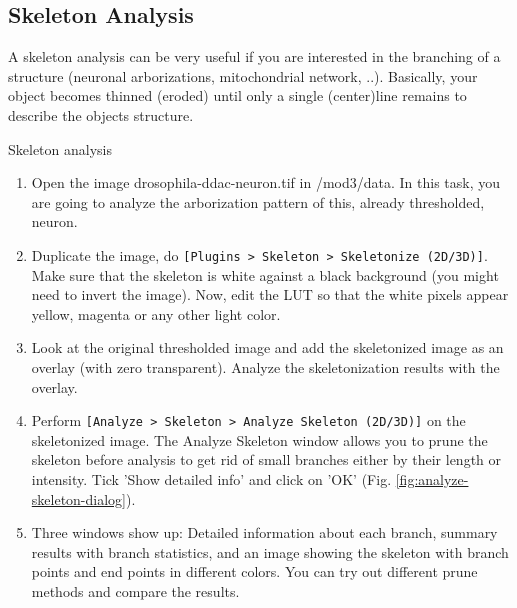 \subsection{Skeleton Analysis}
A skeleton analysis can be very useful if you are interested in the branching of a structure (neuronal arborizations, mitochondrial network, ..). Basically, your object becomes thinned (eroded) until only a single (center)line remains to describe the objects structure. 

\begin{taskbox}{Skeleton analysis}
\begin{enumerate}
	\item Open the image drosophila-ddac-neuron.tif in /mod3/data. In this task, you are going to analyze the arborization pattern of this, already thresholded, neuron. 
	\item Duplicate the image, do \texttt{[Plugins > Skeleton >
            Skeletonize (2D/3D)]}. Make sure that the skeleton is white against a black background (you might need to invert the image). Now, edit the LUT so that the white pixels appear yellow, magenta or any other light color.
	\item Look at the original thresholded image and add the skeletonized image as an overlay (with zero transparent). Analyze the skeletonization results with the overlay.
	\item Perform \texttt{[Analyze > Skeleton > Analyze Skeleton (2D/3D)]} on the skeletonized image. The Analyze Skeleton window allows you to prune the skeleton before analysis to get rid of small branches either by their length or intensity. Tick 'Show detailed info' and click on 'OK' (Fig. \ref{fig:analyze-skeleton-dialog}).
	
	\begin{minipage}[t]{\linewidth}
		\begin{center}
		\medskip
		\label{fig:analyze-skeleton-dialog}
		\end{center}
	\end{minipage}
	
	\item Three windows show up: Detailed information about each branch, summary results with branch statistics, and an image showing the skeleton with branch points and end points in different colors. You can try out different prune methods and compare the results. 
	
	\end{enumerate}
\end{taskbox}

